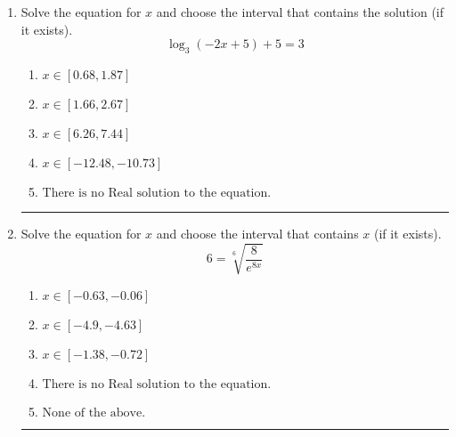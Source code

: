 \documentclass[14pt]{extbook}
\newcommand{\litem}[1]{\item#1\hspace*{-1cm}\rule{\textwidth}{0.4pt}}
\begin{document}
\begin{enumerate}
{\begin{enumerate}[label=\Alph*.]
\end{enumerate} }
\litem{
Solve the equation for $x$ and choose the interval that contains the solution (if it exists).\[ \log_{3}{(-2x+5)}+5 = 3 \]\begin{enumerate}[label=\Alph*.]
\item \( x \in [0.68, 1.87] \)
\item \( x \in [1.66, 2.67] \)
\item \( x \in [6.26, 7.44] \)
\item \( x \in [-12.48, -10.73] \)
\item \( \text{There is no Real solution to the equation.} \)

\end{enumerate} }
\litem{
 Solve the equation for $x$ and choose the interval that contains $x$ (if it exists).\[  6 = \sqrt[6]{\frac{8}{e^{8x}}} \]\begin{enumerate}[label=\Alph*.]
\item \( x \in [-0.63, -0.06] \)
\item \( x \in [-4.9, -4.63] \)
\item \( x \in [-1.38, -0.72] \)
\item \( \text{There is no Real solution to the equation.} \)
\item \( \text{None of the above.} \)

\end{enumerate} }
\end{enumerate}
\end{document}
